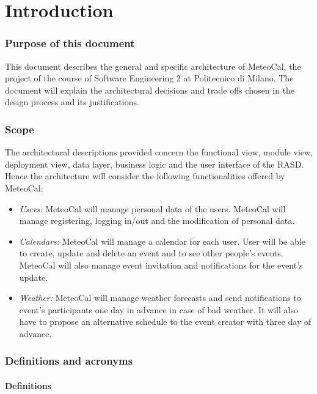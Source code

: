 \documentclass[10pt,a4paper,titlepage]{article}
\begin{document}


\part{Introduction}
\label{part:introduction}

\section{Purpose of this document}
This document describes the general and specific architecture of MeteoCal, the project of the course of Software Engineering 2 at Politecnico di Milano.
The document will explain the architectural decisions and trade offs chosen in the design process and its justifications.

\section{Scope}
The architectural descriptions provided concern the functional view, module view, deployment view, data layer, business logic and the user interface of the RASD.
Hence the architecture will consider the following functionalities offered by MeteoCal:

\begin{itemize}
\item \emph{Users:} MeteoCal will manage personal data of the users. MeteoCal will manage registering, logging in/out and the modification of personal data.

\item \emph{Calendars:} MeteoCal will manage a calendar for each user. User will be able to create, update and delete an event and to see other people's events. MeteoCal will also manage event invitation and notifications for the event's update.

\item \emph{Weather:} MeteoCal will manage weather forecasts and send notifications to event's participants one day in advance in case of bad weather. It will also have to propose an alternative schedule to the event creator with three day of advance.
\end{itemize}

\section{Definitions and acronyms}

\subsection{Definitions}
\end{document}
